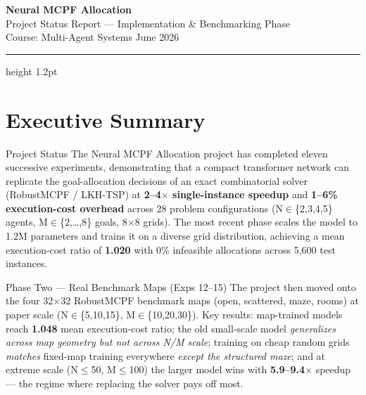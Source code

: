 \documentclass[11pt,a4paper]{article}
\begin{document}
\begin{center}
{\LARGE\bfseries\color{primary} Neural MCPF Allocation}\\[4pt]
{\large Project Status Report --- Implementation \& Benchmarking Phase}\\[6pt]
{\normalsize Course: Multi-Agent Systems \quad\textbar\quad June 2026}
\end{center}
\vspace{6pt}
{\color{primary}\hrule height 1.2pt}
\vspace{10pt}

\section{Executive Summary}

\begin{execbox}{Project Status}
The Neural MCPF Allocation project has completed eleven successive experiments, demonstrating
that a compact transformer network can replicate the goal-allocation decisions of an exact
combinatorial solver (RobustMCPF / LKH-TSP) at \textbf{2--4$\times$ single-instance speedup}
and \textbf{1--6\% execution-cost overhead} across 28 problem configurations
(N$\in$\{2,3,4,5\} agents, M$\in$\{2,\ldots,8\} goals, 8$\times$8 grids). The most recent phase
scales the model to 1.2M parameters and trains it on a diverse grid distribution, achieving
a mean execution-cost ratio of \textbf{1.020} with 0\% infeasible allocations across 5,600 test
instances.
\end{execbox}

\begin{execbox}{Phase Two --- Real Benchmark Maps (Exps 12--15)}
The project then moved onto the four 32$\times$32 RobustMCPF benchmark maps (open, scattered,
maze, rooms) at paper scale (N$\in$\{5,10,15\}, M$\in$\{10,20,30\}). Key results: map-trained
models reach \textbf{1.048} mean execution-cost ratio; the old small-scale model
\emph{generalizes across map geometry but not across N/M scale}; training on cheap random grids
\emph{matches} fixed-map training everywhere \emph{except the structured maze}; and at extreme
scale (N$\le$50, M$\le$100) the larger model wins with \textbf{5.9--9.4$\times$} speedup --- the
regime where replacing the solver pays off most.
\end{execbox}
\end{document}
